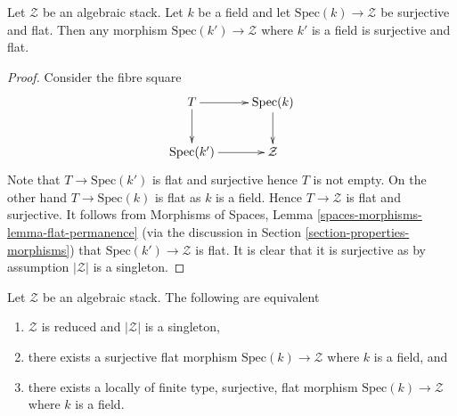 \begin{lemma}
\label{lemma-flat-cover-by-field}
Let $\mathcal{Z}$ be an algebraic stack. Let $k$ be a field and let
$\text{Spec}(k) \to \mathcal{Z}$ be surjective and flat. Then any
morphism $\text{Spec}(k') \to \mathcal{Z}$ where $k'$ is a field is
surjective and flat.
\end{lemma}

\begin{proof}
Consider the fibre square
$$
\xymatrix{
T \ar[d] \ar[r] & \text{Spec}(k) \ar[d] \\
\text{Spec}(k') \ar[r] & \mathcal{Z}
}
$$
Note that $T \to \text{Spec}(k')$ is flat and surjective hence $T$
is not empty. On the other hand $T \to \text{Spec}(k)$ is flat as
$k$ is a field. Hence $T \to \mathcal{Z}$ is flat and surjective.
It follows from
Morphisms of Spaces, Lemma \ref{spaces-morphisms-lemma-flat-permanence}
(via the discussion in
Section \ref{section-properties-morphisms})
that $\text{Spec}(k') \to \mathcal{Z}$ is flat. It is clear that it
is surjective as by assumption $|\mathcal{Z}|$ is a singleton.
\end{proof}

\begin{lemma}
\label{lemma-unique-point}
Let $\mathcal{Z}$ be an algebraic stack. The following are equivalent
\begin{enumerate}
\item $\mathcal{Z}$ is reduced and $|\mathcal{Z}|$ is a singleton,
\item there exists a surjective flat morphism $\text{Spec}(k) \to \mathcal{Z}$
where $k$ is a field, and
\item there exists a locally of finite type, surjective, flat morphism
$\text{Spec}(k) \to \mathcal{Z}$ where $k$ is a field.
\end{enumerate}
\end{lemma}

